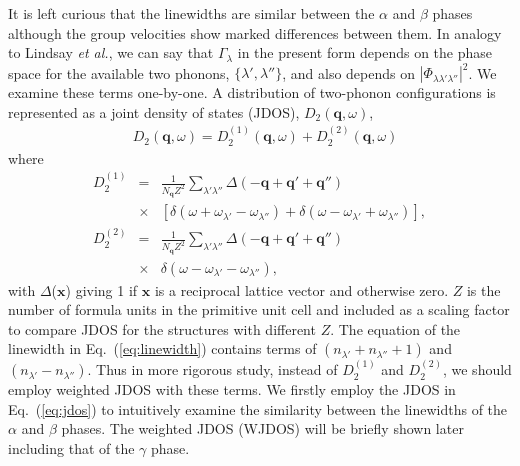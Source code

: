 \documentclass[twocolumn,amsmath,amssymb,a4paper,prb,superscriptaddress,floatfix]{revtex4-1}
\begin{document}
It is left curious that the linewidths are similar between the $\alpha$ and
$\beta$ phases although the group velocities show marked differences between
them.  In analogy to Lindsay {\it et al.}\cite{Lindsay}, we can say that
$\Gamma_\lambda$ in the present form depends on the phase space for the
available two phonons, $\{\lambda', \lambda''\}$, and  also depends on
$|\Phi_{\lambda\lambda'\lambda''}|^2$. We examine these terms one-by-one. A
distribution of two-phonon configurations is represented as a joint density of
states (JDOS),
${D_2(\mathbf{q},\omega)}$,  
\begin{align}
 \label{eq:jdos}
 &D_2(\mathbf{q},\omega) = D_2^{(1)}(\mathbf{q},\omega) +  D_2^{(2)}(\mathbf{q},\omega)
\end{align}
where 
\begin{eqnarray*}
	D_2^{(1)} & = & \frac{1}{N_\mathbf{q}Z^2} \sum_{\lambda'\lambda''}\Delta(-\mathbf{q} + \mathbf{q'} + \mathbf{q''}) \nonumber \\
								   & \times & [\delta(\omega + \omega_{\lambda'} - \omega_{\lambda''}) + \delta(\omega - \omega_{\lambda'} + \omega_{\lambda''})],\\
	D_2^{(2)} & = & \frac{1}{N_\mathbf{q}Z^2} \sum_{\lambda'\lambda''}\Delta(-\mathbf{q} + \mathbf{q'} + \mathbf{q''}) \nonumber \\
								   & \times & \delta(\omega - \omega_{\lambda'} - \omega_{\lambda''}),
\end{eqnarray*}
with $\Delta$($\mathbf{x}$) giving 1 if $\mathbf{x}$ is a reciprocal lattice
vector and otherwise zero. $Z$ is the number of formula units in the primitive unit cell
and included as a scaling factor to compare JDOS for the structures with different
$Z$.  The equation of the linewidth in Eq.~(\ref{eq:linewidth}) contains terms
of $(n_{\lambda'}+n_{\lambda''}+1)$ and $(n_{\lambda'}-n_{\lambda''})$. Thus in
more rigorous study, instead of $D_2^{(1)}$ and $D_2^{(2)}$,  we should
employ weighted JDOS with these terms.  We firstly employ the JDOS in
Eq.~(\ref{eq:jdos}) to intuitively examine the similarity between the
linewidths of the $\alpha$ and $\beta$ phases. The weighted JDOS (WJDOS)
will be briefly shown later including that of the $\gamma$ phase. 
\end{document}
